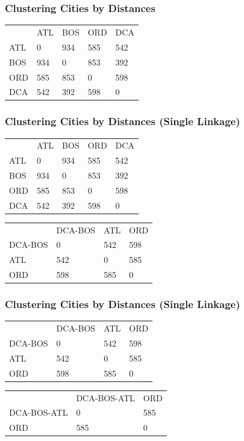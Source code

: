 \documentclass[xcolor=x11names,compress]{beamer}\usepackage[]{graphicx}\usepackage[]{color}
\begin{document}
\begin{frame}
  \frametitle{Clustering Cities by Distances}
  \begin{table}
    \centering
   \begin{tabular}{lllll}
   & ATL&BOS&ORD& DCA\\
ATL&  0 &934&585&542\\
BOS& 934&  0&853& 392\\
ORD& 585&853&  0& 598\\
DCA& 542&392& 598&   0
\end{tabular}
  \end{table}

\end{frame}

\begin{frame}
  \frametitle{Clustering Cities by Distances (Single Linkage)}
  \begin{table}
    \centering
   \begin{tabular}{lllll}
   & ATL&BOS&ORD& DCA\\
ATL&  0 &934&585&542\\
BOS& 934&  0&853& 392\\
ORD& 585&853&  0& 598\\
DCA& 542&392& 598&   0
\end{tabular}
  \end{table}
  \begin{table}
    \centering
   \begin{tabular}{llll}
       &DCA-BOS&ATL&ORD\\
DCA-BOS&0      &542&598   \\
ATL    &542    &0  &585\\
ORD    &598       &585&0
\end{tabular}
  \end{table}
\end{frame}


\begin{frame}
  \frametitle{Clustering Cities by Distances (Single Linkage)}
  \begin{table}
    \centering
   \begin{tabular}{llll}
       &DCA-BOS&ATL&ORD\\
DCA-BOS&0      &542&598   \\
ATL    &542    &0  &585\\
ORD    &598       &585&0
\end{tabular}
  \end{table}

  \begin{table}
    \centering
   \begin{tabular}{lll}
           &DCA-BOS-ATL&ORD\\
DCA-BOS-ATL&0          &585   \\
ORD        &585        &0
\end{tabular}
  \end{table}
\end{frame}
\end{document}
